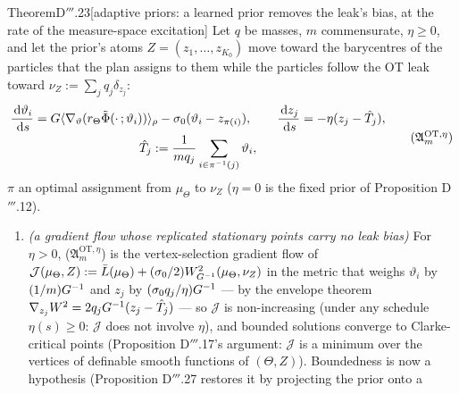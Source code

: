 \begin{thm}{Theorem}{D$'''$.23}[adaptive priors: a learned prior removes the leak's bias, at the rate of the
measure-space excitation]\label{res:thmDppp:23}%
Let $q$ be masses, $m$ commensurate, $\eta\ge0$, and let the prior's atoms $Z = (z_1,\dots,z_{K_0})$ move toward the
barycentres of the particles that the plan assigns to them while the particles follow the OT leak toward
$\nu_Z := \sum_jq_j\delta_{z_j}$:
\begin{equation}
  \begin{gathered}
    \frac{\dd\vartheta_i}{\dd s} = G\langle\nabla_\vartheta(r_\Theta\tilde\Phi(\cdot\,;\vartheta_i))\rangle_\rho
    - \sigma_0(\vartheta_i - z_{\pi(i)}),\qquad
    \frac{\dd z_j}{\dd s} = -\eta(z_j - \hat T_j),\\
    \hat T_j := \frac{1}{mq_j}\sum_{i\in\pi^{-1}(j)}\vartheta_i,
  \end{gathered}
  \tag{$\mathfrak{A}_m^{\mathrm{OT},\eta}$}
\end{equation}
$\pi$ an optimal assignment from $\mu_\Theta$ to $\nu_Z$ ($\eta = 0$ is the fixed prior of Proposition D$'''$.12).
\begin{enumerate}[label=\textup{(\roman*)}]
  \item \emph{(a gradient flow whose replicated stationary points carry no leak bias)} For $\eta > 0$,
    \textup{($\mathfrak{A}_m^{\mathrm{OT},\eta}$)} is the vertex-selection gradient flow of
    $\mathcal{J}(\mu_\Theta,Z) := \bar L(\mu_\Theta) + (\sigma_0/2)W^2_{G^{-1}}(\mu_\Theta,\nu_Z)$ in the metric that
    weighs $\vartheta_i$ by $(1/m)G^{-1}$ and $z_j$ by $(\sigma_0q_j/\eta)G^{-1}$ --- by the envelope theorem
    $\nabla_{z_j}W^2 = 2q_jG^{-1}(z_j - \hat T_j)$ --- so $\mathcal{J}$ is non-increasing (under any schedule
    $\eta(s)\ge0$: $\mathcal{J}$ does not involve $\eta$), and bounded solutions converge to Clarke-critical points
    (Proposition D$'''$.17's argument: $\mathcal{J}$ is a minimum over the vertices of definable smooth functions of
    $(\Theta,Z)$). Boundedness is now a hypothesis (Proposition D$'''$.27 restores it by projecting the prior onto a

\end{enumerate}
\end{thm}
